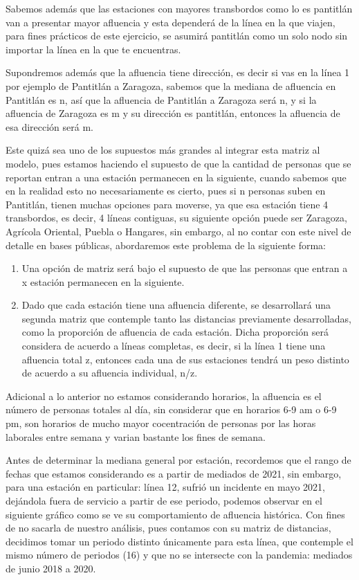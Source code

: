 \documentclass[
]{article}
\begin{document}
Sabemos además que las estaciones con mayores transbordos como lo es
pantitlán van a presentar mayor afluencia y esta dependerá de la línea
en la que viajen, para fines prácticos de este ejercicio, se asumirá
pantitlán como un solo nodo sin importar la línea en la que te
encuentras.

Supondremos además que la afluencia tiene dirección, es decir si vas en
la línea 1 por ejemplo de Pantitlán a Zaragoza, sabemos que la mediana
de afluencia en Pantitlán es n, así que la afluencia de Pantitlán a
Zaragoza será n, y si la afluencia de Zaragoza es m y su dirección es
pantitlán, entonces la afluencia de esa dirección será m.

Este quizá sea uno de los supuestos más grandes al integrar esta matriz
al modelo, pues estamos haciendo el supuesto de que la cantidad de
personas que se reportan entran a una estación permanecen en la
siguiente, cuando sabemos que en la realidad esto no necesariamente es
cierto, pues si n personas suben en Pantitlán, tienen muchas opciones
para moverse, ya que esa estación tiene 4 transbordos, es decir, 4
líneas contiguas, su siguiente opción puede ser Zaragoza, Agrícola
Oriental, Puebla o Hangares, sin embargo, al no contar con este nivel de
detalle en bases públicas, abordaremos este problema de la siguiente
forma:

\begin{enumerate}
\def\labelenumi{\arabic{enumi}.}
\item
  Una opción de matriz será bajo el supuesto de que las personas que
  entran a x estación permanecen en la siguiente.
\item
  Dado que cada estación tiene una afluencia diferente, se desarrollará
  una segunda matriz que contemple tanto las distancias previamente
  desarrolladas, como la proporción de afluencia de cada estación. Dicha
  proporción será considera de acuerdo a líneas completas, es decir, si
  la línea 1 tiene una afluencia total z, entonces cada una de sus
  estaciones tendrá un peso distinto de acuerdo a su afluencia
  individual, n/z.
\end{enumerate}

Adicional a lo anterior no estamos considerando horarios, la afluencia
es el número de personas totales al día, sin considerar que en horarios
6-9 am o 6-9 pm, son horarios de mucho mayor cocentración de personas
por las horas laborales entre semana y varian bastante los fines de
semana.

Antes de determinar la mediana general por estación, recordemos que el
rango de fechas que estamos considerando es a partir de mediados de
2021, sin embargo, para una estación en particular: línea 12, sufrió un
incidente en mayo 2021, dejándola fuera de servicio a partir de ese
periodo, podemos observar en el siguiente gráfico como se ve su
comportamiento de afluencia histórica. Con fines de no sacarla de
nuestro análisis, pues contamos con su matriz de distancias, decidimos
tomar un periodo distinto únicamente para esta línea, que contemple el
mismo número de periodos (16) y que no se intersecte con la pandemia:
mediados de junio 2018 a 2020.
\end{document}
